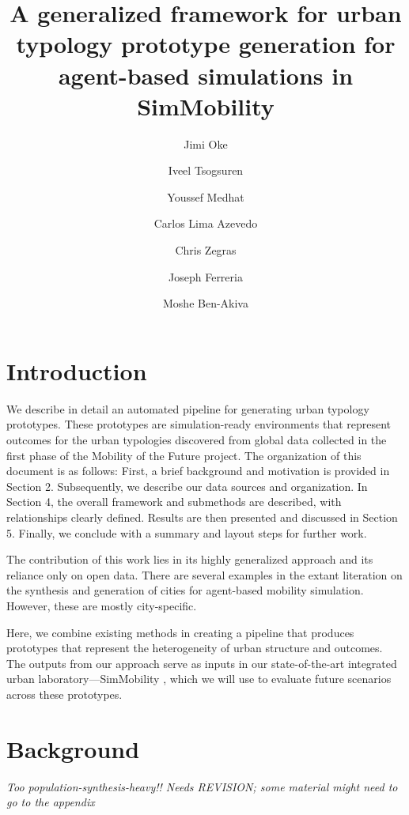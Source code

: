 \documentclass[11pt,twoside]{article}
\numberwithin{equation}{section}
\newcommand{\?}{\stackrel{?}{=}}
\begin{document}
\title{A generalized framework for urban typology prototype generation for agent-based simulations in SimMobility}
\author{Jimi Oke \and Iveel Tsogsuren \and Youssef Medhat \and Carlos Lima Azevedo \and Chris Zegras \and Joseph Ferreria \and Moshe Ben-Akiva}

\maketitle

\tableofcontents

\newpage

\section{Introduction}
We describe in detail an automated pipeline for generating urban typology prototypes.
These prototypes are simulation-ready environments that represent outcomes for the urban typologies discovered from global data collected in the first phase of the Mobility of the Future project.
The organization of this document is as follows: First, a brief background and motivation is provided in Section 2. Subsequently, we describe our data sources and organization.
In Section 4, the overall framework and submethods are described, with relationships clearly defined.
Results are then presented and discussed in Section 5.
Finally, we conclude with a summary and layout steps for further work.

The contribution of this work lies in its highly generalized approach and its reliance only on open data.
There are several examples in the extant literation on the synthesis and generation of cities for agent-based mobility simulation.
However, these are mostly city-specific.

Here, we combine existing methods in creating a pipeline that produces prototypes that represent the heterogeneity of urban structure and outcomes.
The outputs from our approach serve as inputs in our state-of-the-art integrated urban laboratory---SimMobility \citep{adnan2016simmobility}, which we will use to evaluate future scenarios across these prototypes.

\section{Background}
{\it Too population-synthesis-heavy!! Needs REVISION; some material might need to go to the appendix}\\
\end{document}
